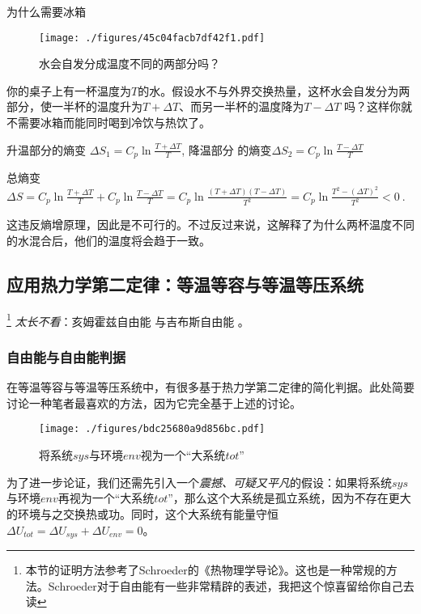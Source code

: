 \begin{example}{为什么需要冰箱}
\begin{figure}[ht]
\centering
\texttt{[image: ./figures/45c04facb7df42f1.pdf]}
\caption{水会自发分成温度不同的两部分吗？} \label{fig_Td2Law_5}
\end{figure}
你的桌子上有一杯温度为$T$的水。假设水不与外界交换热量，这杯水会自发分为两部分，使一半杯的温度升为$T+\Delta T$、而另一半杯的温度降为$T-\Delta T$ 吗？这样你就不需要冰箱而能同时喝到冷饮与热饮了。

升温部分的熵变 $\Delta S_1=C_p \ln \frac{T+\Delta T}{T}$, 降温部分 的熵变$\Delta S_2=C_p \ln \frac{T-\Delta T}{T}$

总熵变 $\Delta S = C_p \ln \frac{T+\Delta T}{T} + C_p \ln \frac{T-\Delta T}{T} = C_p \ln \frac{(T+\Delta T)(T-\Delta T)}{T^2}= C_p \ln \frac{T^2 - (\Delta T)^2}{T^2}<0~.$

这违反熵增原理，因此是不可行的。不过反过来说，这解释了为什么两杯温度不同的水混合后，他们的温度将会趋于一致。

\end{example}

\subsection{应用热力学第二定律：等温等容与等温等压系统}
\footnote{本节的证明方法参考了Schroeder的《热物理学导论》。这也是一种常规的方法。Schroeder对于自由能有一些非常精辟的表述，我把这个惊喜留给你自己去读} 
\textsl{太长不看}：亥姆霍兹自由能 与吉布斯自由能 。


\subsubsection{自由能与自由能判据}
在等温等容与等温等压系统中，有很多基于热力学第二定律的简化判据。此处简要讨论一种笔者最喜欢的方法，因为它完全基于上述的讨论。

\begin{figure}[ht]
\centering
\texttt{[image: ./figures/bdc25680a9d856bc.pdf]}
\caption{将系统$sys$与环境$env$视为一个“大系统$tot$”} \label{fig_Td2Law_3}
\end{figure}

为了进一步论证，我们还需先引入一个\textsl{震撼、可疑又平凡}的假设：如果将系统$sys$与环境$env$再视为一个“大系统$tot$”，那么这个大系统是孤立系统，因为不存在更大的环境与之交换热或功。同时，这个大系统有能量守恒 $\Delta U_{tot} = \Delta U_{sys} + \Delta U_{env} = 0$。

